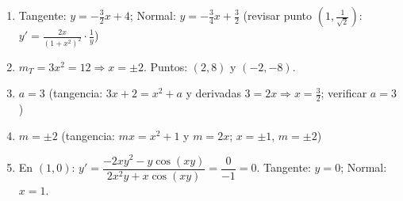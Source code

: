 \documentclass[12pt, letterpaper]{article}
\begin{document}
\begin{enumerate}[leftmargin=*, label=\textbf{\arabic*.}]
    \item Tangente: $y = -\frac{3}{2}x + 4$; Normal: $y = -\frac{3}{4}x + \frac{3}{2}$ (revisar punto $(1, \frac{1}{\sqrt{2}})$: $y' = \frac{2x}{(1+x^2)^2}\cdot\frac{1}{y}$)
    \item $m_T = 3x^2 = 12 \Rightarrow x = \pm 2$. Puntos: $(2, 8)$ y $(-2, -8)$.
    \item $a = 3$ (tangencia: $3x+2 = x^2 + a$ y derivadas $3 = 2x \Rightarrow x = \frac{3}{2}$; verificar $a = 3$)
    \item $m = \pm 2$ (tangencia: $mx = x^2+1$ y $m = 2x$; $x = \pm 1$, $m = \pm 2$)
    \item En $(1,0)$: $y' = \dfrac{-2xy^2 - y\cos(xy)}{2x^2y + x\cos(xy)} = \dfrac{0}{-1} = 0$. Tangente: $y = 0$; Normal: $x = 1$.

  \end{enumerate}
\fi
\end{document}
